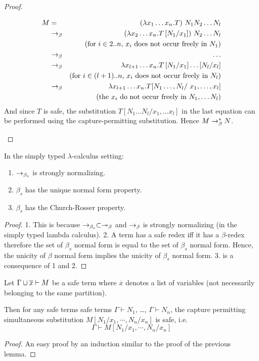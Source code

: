 \begin{proof}
\begin{itemize}
\begin{eqnarray*}
 M &=& (\lambda x_1 \ldots x_n .T) \ N_1  N_2 \ldots N_l  \\
     &\betared& (\lambda x_2 \ldots x_n .T \subst{N_1}{x_1} ) \ N_2 \ldots N_l \\
            && \mbox{(for $i \in 2..n$, $x_i$ does not occur freely in $N_1$)}\\
    &\betared& \ldots \\
    &\betared& \lambda x_{l+1} \ldots x_n . T \subst{N_1}{x_1}  \ldots \subst{N_l}{x_l} \\
        && \mbox{(for $i \in (l+1)..n$,  $x_i$ does not occur freely in $N_l$)}\\
    &\betared& \lambda x_{l+1} \ldots x_n . T [N_1\ldots, N_l /  \ x_1,\ldots, x_l] \\
        && \mbox{(the $x_i$ do not occur freely in $N_1, \ldots N_l$)}
\end{eqnarray*}
And since $T$ is safe, the substitution $T [N_1\ldots N_l/x_1,\ldots x_l]$ in the last equation
can be performed using the capture-permitting substitution. Hence $M \rightarrow_\beta^* N$.
\end{itemize}
\end{proof}

\begin{property} In the simply typed $\lambda$-calculus setting:
\begin{enumerate}
\item $\rightarrow_{\beta_s}$ is strongly normalizing.
\item $\beta_s$ has the unique normal form property.
\item $\beta_s$ has the Church-Rosser property.
\end{enumerate}
\end{property}

\begin{proof}
1. This is because $\rightarrow_{\beta_s} \subset \twoheadrightarrow_\beta$ and $\rightarrow_\beta$ is strongly normalizing (in the simply typed lambda calculus).
2. A term has a safe redex iff it has a $\beta$-redex therefore
the set of $\beta_s$ normal form is equal to the set of $\beta_s$
normal form. Hence, the unicity of $\beta$ normal form implies the
unicity of $\beta_s$ normal form.
3. is a consequence of 1 and 2.
\end{proof}



\begin{lem}
\label{lem:subst_preserve_safety}
Let $\Gamma \cup \overline{x} \vdash M$ be a safe term where $\overline{x}$ denotes a list of variables
(not necessarily belonging to the same partition).

Then for any safe terms safe terms $\Gamma \vdash N_1$, \ldots, $\Gamma \vdash N_n$,
the capture permitting simultaneous substitution $M[N_1 / x_1 , \cdots, N_n / x_n]$ is safe, i.e.
$$ \Gamma \vdash M[N_1 / x_1 , \cdots, N_n / x_n] $$
\end{lem}
\begin{proof}
An easy proof by an induction similar to the proof of the previous lemma.
\end{proof}

